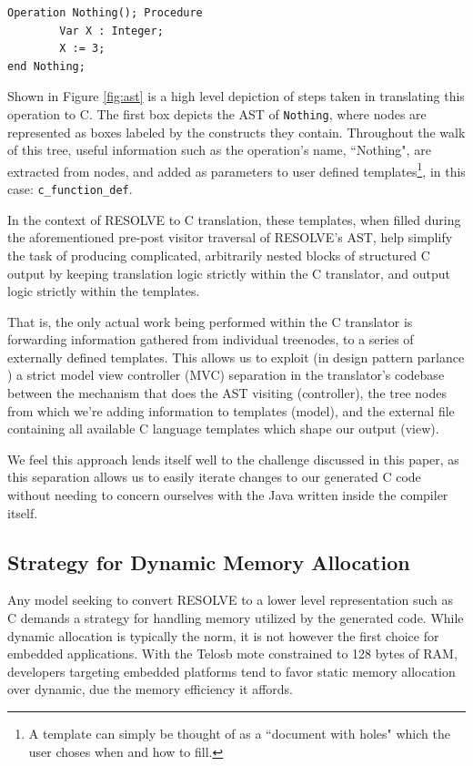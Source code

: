 \begin{verbatim}
Operation Nothing(); Procedure
        Var X : Integer;
        X := 3;
end Nothing;
\end{verbatim}

Shown in Figure \ref{fig:ast} is a high level depiction of steps taken in translating this operation to C. The first box depicts the AST of \texttt{Nothing}, where nodes are represented as boxes labeled by the constructs they contain. Throughout the walk of this tree, useful information such as the operation's name, ``Nothing", are extracted from nodes, and added as parameters to user defined templates\footnote{A template can simply be thought of as a ``document with holes" which the user choses when and how to fill.}, in this case: \texttt{c\_function\_def}.

In the context of RESOLVE to C translation, these templates, when filled during the aforementioned pre-post visitor traversal of RESOLVE's AST, help simplify the task of producing complicated, arbitrarily nested blocks of structured C output by keeping translation logic strictly within the C translator, and output logic strictly within the templates.

That is, the only actual work being performed within the C translator is forwarding information gathered from individual treenodes, to a series of externally defined templates. This allows us to exploit (in design pattern parlance \cite{krasner:1988}) a strict model view controller (MVC) separation in the translator's codebase between the mechanism that does the AST visiting (controller), the tree nodes from which we're adding information to templates (model), and the external file containing all available C language templates which shape our output (view).

We feel this approach lends itself well to the challenge discussed in this paper, as this separation allows us to easily iterate changes to our generated C code without needing to concern ourselves with the Java written inside the compiler itself.

\subsection{Strategy for Dynamic Memory Allocation}\label{sec:mem}

Any model seeking to convert RESOLVE to a lower level representation such as C demands a strategy for handling memory utilized by the generated code. While dynamic allocation is typically the norm, it is not however the first choice for embedded applications. With the Telosb mote constrained to 128 bytes of RAM, developers targeting embedded platforms tend to favor static memory allocation over dynamic, due the memory efficiency it affords. 

